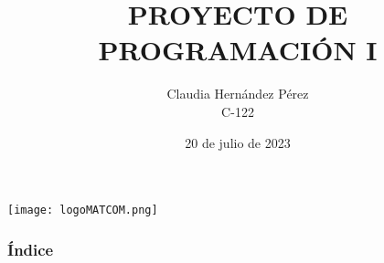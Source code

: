 \documentclass{beamer}
\title[Moogle!]{\textbf{PROYECTO DE PROGRAMACIÓN I}}
\author[Claudia Hernández Pérez]{Claudia Hernández Pérez\\C-122}
\institute[MATCOM]{Facultad de Matemática y Computación}
\date{20 de julio de 2023}
\begin{document}
    \frame
    {
        \begin{flushright}
            \texttt{[image: logoMATCOM.png]}
        \end{flushright}    
        \titlepage 
    }   

    \begin{frame}
        \frametitle{Índice}
        \tableofcontents
    \end{frame}

    
    
    
    
\end{document}
